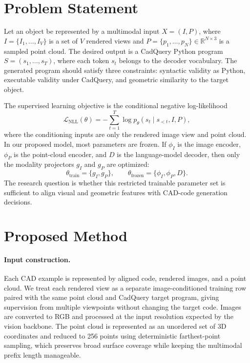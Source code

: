 \documentclass{article}
\begin{document}
\section{Problem Statement}

Let an object be represented by a multimodal input $X=(I,P)$, where $I=\{I_1,\dots,I_V\}$ is a set of $V$ rendered views and $P=\{p_1,\dots,p_N\}\in\mathbb{R}^{N\times3}$ is a sampled point cloud. The desired output is a CadQuery Python program $S=(s_1,\dots,s_T)$, where each token $s_t$ belongs to the decoder vocabulary. The generated program should satisfy three constraints: syntactic validity as Python, executable validity under CadQuery, and geometric similarity to the target object.

The supervised learning objective is the conditional negative log-likelihood
\begin{equation}
\mathcal{L}_{\mathrm{NLL}}(\theta)
=-\sum_{t=1}^{T}\log p_{\theta}(s_t \mid s_{<t}, I, P),
\end{equation}
where the conditioning inputs are only the rendered image view and point cloud. In our proposed model, most parameters are frozen. If $\phi_I$ is the image encoder, $\phi_P$ is the point-cloud encoder, and $D$ is the language-model decoder, then only the modality projectors $g_I$ and $g_P$ are optimized:
\begin{equation}
\theta_{\mathrm{train}}=\{g_I,g_P\}, \qquad
\theta_{\mathrm{frozen}}=\{\phi_I,\phi_P,D\}.
\end{equation}
The research question is whether this restricted trainable parameter set is sufficient to align visual and geometric features with CAD-code generation decisions.

\section{Proposed Method}

\paragraph{Input construction.}
Each CAD example is represented by aligned code, rendered images, and a point cloud. We treat each rendered view as a separate image-conditioned training row paired with the same point cloud and CadQuery target program, giving supervision from multiple viewpoints without changing the target code. Images are converted to RGB and processed at the input resolution expected by the vision backbone. The point cloud is represented as an unordered set of 3D coordinates and reduced to 256 points using deterministic farthest-point sampling, which preserves broad surface coverage while keeping the multimodal prefix length manageable.
\end{document}
